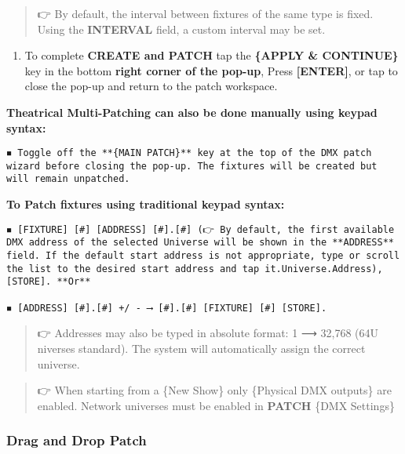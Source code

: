 \documentclass[
]{article}
\providecommand{\tightlist}{%
  \setlength{\itemsep}{0pt}\setlength{\parskip}{0pt}}
\begin{document}
\begin{quote}
👉 By default, the interval between fixtures of the same type is fixed.
Using the \textbf{INTERVAL} field, a custom interval may be set.
\end{quote}

\begin{enumerate}
\def\labelenumi{\arabic{enumi}.}
\setcounter{enumi}{10}
\tightlist
\item
  To complete \textbf{CREATE and PATCH} tap the \textbf{\{APPLY \& CONTINUE\}} key in the bottom \textbf{right corner of the pop-up}, Press \textbf{{[}ENTER{]}}, or tap \href{image.png}{} to close the pop-up and return to the patch workspace.
\end{enumerate}

\textbf{Theatrical Multi-Patching can also be done manually using keypad syntax:}

\begin{verbatim}
◾ Toggle off the **{MAIN PATCH}** key at the top of the DMX patch wizard before closing the pop-up. The fixtures will be created but will remain unpatched.
\end{verbatim}

\textbf{To Patch fixtures using traditional keypad syntax:}

\begin{verbatim}
◾ [FIXTURE] [#] [ADDRESS] [#].[#] (👉 By default, the first available DMX address of the selected Universe will be shown in the **ADDRESS** field. If the default start address is not appropriate, type or scroll the list to the desired start address and tap it.Universe.Address), [STORE]. **Or** 

◾ [ADDRESS] [#].[#] +/ - ⟶ [#].[#] [FIXTURE] [#] [STORE].
\end{verbatim}

\begin{quote}
👉 Addresses may also be typed in absolute format: 1 ⟶ 32,768 (64U niverses standard). The system will automatically assign the correct universe.
\end{quote}

\begin{quote}
👉 When starting from a \{New Show\} only \{Physical DMX outputs\} are enabled. Network universes must be enabled in \textbf{PATCH} \{DMX Settings\}
\end{quote}

\hypertarget{drag-and-drop-patch}{%
\subsubsection{Drag and Drop Patch}\label{drag-and-drop-patch}}
\end{document}
